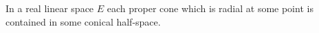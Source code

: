 In a real linear space $E$ each proper cone which is radial at some point is contained in some conical half-space.
